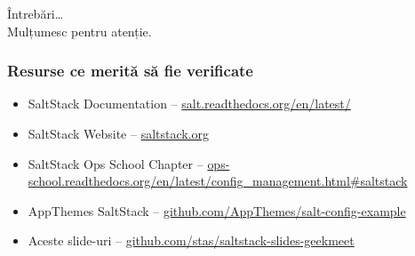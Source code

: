 \documentclass[compress]{beamer}
\begin{document}
\begin{frame}
  \begin{center}
  \huge Întrebări\ldots
  \\
  Mulțumesc pentru atenție.
  \end{center}
\end{frame}

\begin{frame}
\frametitle{Resurse ce merită să fie verificate}

\begin{itemize}
  \item SaltStack Documentation -- \href{http://salt.readthedocs.org/en/latest/}{salt.readthedocs.org/en/latest/}
  \item SaltStack Website -- \href{http://saltstack.com/about.html}{saltstack.org}
  \item SaltStack Ops School Chapter -- \href{http://ops-school.readthedocs.org/en/latest/config\_management.html\#saltstack}{ops-school.readthedocs.org/en/latest/config\_management.html\#saltstack}
  \item AppThemes SaltStack -- \href{https://github.com/AppThemes/salt-config-example}{github.com/AppThemes/salt-config-example}
  \item Aceste slide-uri -- \href{https://github.com/stas/saltstack-slides-geekmeet}{github.com/stas/saltstack-slides-geekmeet}
\end{itemize}

\end{frame}
\end{document}
